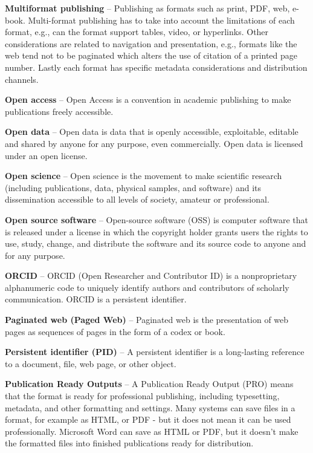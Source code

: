 \documentclass{article}
\begin{document}
\textbf{Multiformat publishing} – Publishing as formats such as print, PDF, web, e-book. Multi-format publishing has to take into account the limitations of each format, e.g., can the format support tables, video, or hyperlinks. Other considerations are related to navigation and presentation, e.g., formats like the web tend not to be paginated which alters the use of citation of a printed page number. Lastly each format has specific metadata considerations and distribution channels.


\textbf{Open access} – Open Access is a convention in academic publishing to make publications freely accessible.


\textbf{Open data} – Open data is data that is openly accessible, exploitable, editable and shared by anyone for any purpose, even commercially. Open data is licensed under an open license.


\textbf{Open science} – Open science is the movement to make scientific research (including publications, data, physical samples, and software) and its dissemination accessible to all levels of society, amateur or professional.


\textbf{Open source software} – Open-source software (OSS) is computer software that is released under a license in which the copyright holder grants users the rights to use, study, change, and distribute the software and its source code to anyone and for any purpose.


\textbf{ORCID} – ORCID (Open Researcher and Contributor ID) is a nonproprietary alphanumeric code to uniquely identify authors and contributors of scholarly communication. ORCID is a persistent identifier. 


\textbf{Paginated web (Paged Web)} – Paginated web is the presentation of web pages as sequences of pages in the form of a codex or book. 


\textbf{Persistent identifier (PID)} – A persistent identifier is a long-lasting reference to a document, file, web page, or other object.


\textbf{Publication Ready Outputs} – A Publication Ready Output (PRO) means that the format is ready for professional publishing, including typesetting, metadata, and other formatting and settings. Many systems can save files in a format, for example as HTML, or PDF - but it does not mean it can be used professionally. Microsoft Word can save as HTML or PDF, but it doesn't make the formatted files into finished publications ready for distribution.
\end{document}
